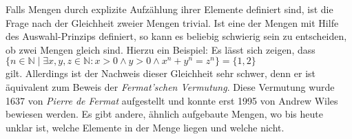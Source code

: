 Falls Mengen durch explizite Aufzählung ihrer Elemente definiert sind, ist die Frage nach
der Gleichheit zweier Mengen trivial.  Ist eine der Mengen mit Hilfe des Auswahl-Prinzips definiert, so
kann es beliebig schwierig sein zu entscheiden, ob zwei Mengen gleich sind.  Hierzu ein
Beispiel:  Es lässt sich zeigen, dass \\[0.2cm]
\hspace*{1.3cm} 
$\{ n \in \mathbb{N} \mid \exists x, y, z\in\mathbb{N}: x > 0 \wedge y > 0 \wedge x^n + y^n = z^n \} 
= \{1,2\}$ \\[0.2cm]
gilt.  Allerdings ist der Nachweis dieser Gleichheit sehr schwer, denn er ist äquivalent
zum Beweis der \emph{Fermat'schen Vermutung}. Diese Vermutung wurde 1637
von {\sl Pierre de Fermat} aufgestellt und konnte erst 1995 von Andrew Wiles bewiesen werden.
Es gibt andere, ähnlich aufgebaute Mengen, wo bis heute unklar ist, welche Elemente in der
Menge liegen und welche nicht.



